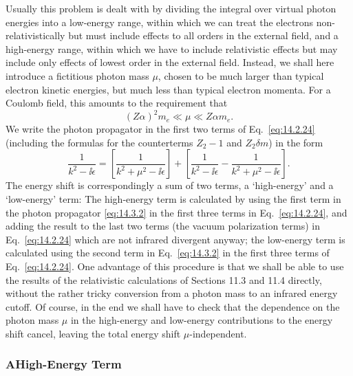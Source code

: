 Usually this problem is dealt with by dividing the integral over virtual
photon energies into a low-energy range, within which we can treat the
electrons non-relativistically but must include effects to all orders in the
external field, and a high-energy range, within which we have to include
relativistic effects but may include only effects of lowest order in the
external field. Instead, we shall here introduce a fictitious photon mass
$\mu$, chosen to be much larger than typical electron kinetic energies, but
much less than typical electron momenta. For a Coulomb field, this amounts to
the requirement that
\begin{equation}
(Z\alpha)^2m_e\ll\mu\ll Z\alpha m_e.
\tag{14.3.1}\label{eq:14.3.1}
\end{equation}
We write the photon propagator in the first two terms of Eq.~\eqref{eq:14.2.24}
(including the formulas for the counterterms $Z_2-1$ and $Z_2\delta m$) in the
form
\begin{equation}
\frac{1}{k^2-\ii\epsilon}
=\left[\frac{1}{k^2+\mu^2-\ii\epsilon}\right]
+\left[\frac{1}{k^2-\ii\epsilon}
-\frac{1}{k^2+\mu^2-\ii\epsilon}\right].
\tag{14.3.2}\label{eq:14.3.2}
\end{equation}
The energy shift is correspondingly a sum of two terms, a `high-energy' and a
`low-energy' term: The high-energy term is calculated by using the first term
in the photon propagator \eqref{eq:14.3.2} in the first three terms in
Eq.~\eqref{eq:14.2.24}, and adding the result to the last two terms (the vacuum
polarization terms) in Eq.~\eqref{eq:14.2.24} which are not infrared divergent
anyway; the low-energy term is calculated using the second term in
Eq.~\eqref{eq:14.3.2} in the first three terms of Eq.~\eqref{eq:14.2.24}. One
advantage of this procedure is that we shall be able to use the results of the
relativistic calculations of Sections 11.3 and 11.4 directly, without the
rather tricky conversion from a photon mass to an infrared energy cutoff. Of
course, in the end we shall have to check that the dependence on the photon
mass $\mu$ in the high-energy and low-energy contributions to the energy shift
cancel, leaving the total energy shift $\mu$-independent.

\subsubsection*{A\quad High-Energy Term}

